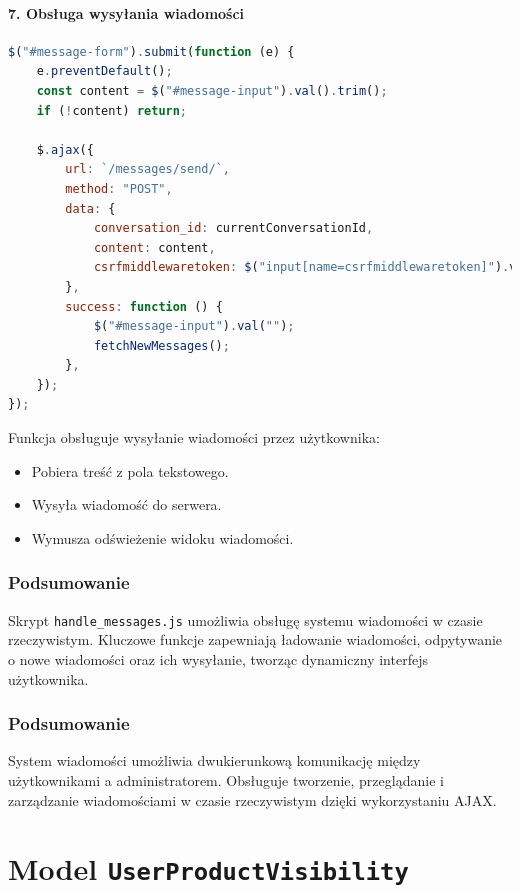 \documentclass[12pt,a4paper,oneside]{article}
\theoremstyle{definition}
\numberwithin{equation}{section}
\begin{document}
\paragraph{7. Obsługa wysyłania wiadomości}
\begin{lstlisting}[language=JavaScript, caption=Wysyłanie wiadomości]
$("#message-form").submit(function (e) {
    e.preventDefault();
    const content = $("#message-input").val().trim();
    if (!content) return;

    $.ajax({
        url: `/messages/send/`,
        method: "POST",
        data: {
            conversation_id: currentConversationId,
            content: content,
            csrfmiddlewaretoken: $("input[name=csrfmiddlewaretoken]").val(),
        },
        success: function () {
            $("#message-input").val("");
            fetchNewMessages();
        },
    });
});
\end{lstlisting}
Funkcja obsługuje wysyłanie wiadomości przez użytkownika:
\begin{itemize}
    \item Pobiera treść z pola tekstowego.
    \item Wysyła wiadomość do serwera.
    \item Wymusza odświeżenie widoku wiadomości.
\end{itemize}



\subsubsection{Podsumowanie}
Skrypt \texttt{handle\_messages.js} umożliwia obsługę systemu wiadomości w czasie rzeczywistym. Kluczowe funkcje zapewniają ładowanie wiadomości, odpytywanie o nowe wiadomości oraz ich wysyłanie, tworząc dynamiczny interfejs użytkownika.



\subsubsection{Podsumowanie}
System wiadomości umożliwia dwukierunkową komunikację między użytkownikami a administratorem. Obsługuje tworzenie, przeglądanie i zarządzanie wiadomościami w czasie rzeczywistym dzięki wykorzystaniu AJAX.


% 
% 


\section{Model \texttt{UserProductVisibility}}
\end{document}
